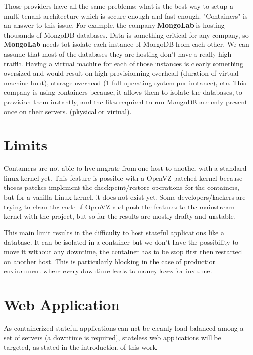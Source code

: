 Those providers have all the same problems: what is the best way to setup a
multi-tenant architecture which is secure enough and fast enough. "Containers"
is an answer to this issue. For example, the company \textbf{MongoLab} is hosting
thousands of MongoDB databases. Data is something critical for any company, so
\textbf{MongoLab} needs tot isolate each instance of MongoDB from each other.
We can assume that most of the databases they are hosting don't have a really high
traffic. Having a virtual machine for each of those instances is clearly something
oversized and would result on high provisionning overhead (duration of virtual
machine boot), storage overhead (1 full operating system per instance), etc.
This company is using containers because, it allows them to isolate the databases,
to provision them instantly, and the files required to run MongoDB are
only present once on their servers. (physical or virtual).

\section{Limits}

Containers are not able to live-migrate from one host to another with a
standard linux kernel yet. This feature is possible with a OpenVZ patched
kernel because thoses patches implement the checkpoint/restore operations for
the containers, but for a vanilla Linux kernel, it does not exist yet. Some
developers/hackers are trying to clean the code of OpenVZ and push the features
to the mainstream kernel with the \cite{websiteCRIU} project, but so far the
results are mostly drafty and unstable.

This main limit results in the difficulty to host stateful applications like a
database. It can be isolated in a container but we don't have the possibility
to move it without any downtime, the container has to be stop first then
restarted on another host. This is particularly blocking in the case of
production environment where every downtime leads to money loses for instance.

\section{Web Application}

As containerized stateful applications can not be cleanly load balanced among a
set of servers (a downtime is required), stateless web applications will be
targeted, as stated in the introduction of this work.

